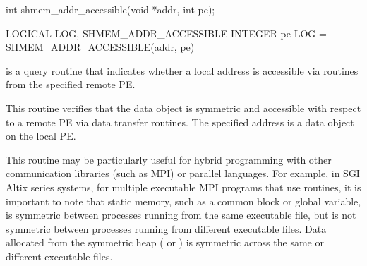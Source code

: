 \synC
int shmem_addr_accessible(void *addr, int pe); %

\synF
LOGICAL LOG, SHMEM_ADDR_ACCESSIBLE
INTEGER pe
LOG = SHMEM_ADDR_ACCESSIBLE(addr, pe) %


{
        is a query routine that indicates whether a
       local address is accessible via \openshmem routines from the specified
       remote \ac{PE}. 
       
       This routine verifies that the data object is symmetric and accessible
       with respect to a remote \ac{PE} via \openshmem  data  transfer  routines.  The
       specified address  is a data object on the local \ac{PE}. 
       
       This routine may be particularly useful for hybrid programming with 
       other communication libraries (such as \ac{MPI}) or parallel languages. 
       For example, in SGI Altix series systems, for multiple executable MPI programs
       that use \openshmem routines, it is important to note that static memory,
       such as a \Fortran{} common block or \Clang{} global variable, is symmetric
       between processes running from the same executable file, but is not
       symmetric between processes running from different executable files.
       Data allocated from the symmetric heap ( or ) is
       symmetric across the same or different executable files.
}
{
}
\eAPI
